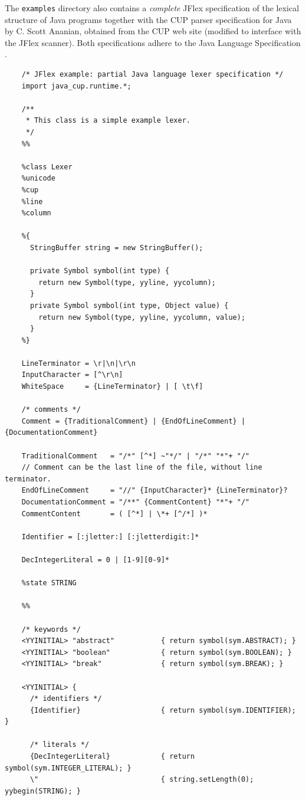 The \texttt{examples} directory also contains a \emph{complete} JFlex
specification of the lexical structure of Java programs together with
the CUP parser specification for Java by C. Scott Ananian, obtained from
the CUP \autocite{CUP} web site (modified to interface with the JFlex
scanner). Both specifications adhere to the Java Language Specification
\autocite{LangSpec}.

\begin{verbatim}
    /* JFlex example: partial Java language lexer specification */
    import java_cup.runtime.*;

    /**
     * This class is a simple example lexer.
     */
    %%

    %class Lexer
    %unicode
    %cup
    %line
    %column

    %{
      StringBuffer string = new StringBuffer();

      private Symbol symbol(int type) {
        return new Symbol(type, yyline, yycolumn);
      }
      private Symbol symbol(int type, Object value) {
        return new Symbol(type, yyline, yycolumn, value);
      }
    %}

    LineTerminator = \r|\n|\r\n
    InputCharacter = [^\r\n]
    WhiteSpace     = {LineTerminator} | [ \t\f]

    /* comments */
    Comment = {TraditionalComment} | {EndOfLineComment} | {DocumentationComment}

    TraditionalComment   = "/*" [^*] ~"*/" | "/*" "*"+ "/"
    // Comment can be the last line of the file, without line terminator.
    EndOfLineComment     = "//" {InputCharacter}* {LineTerminator}?
    DocumentationComment = "/**" {CommentContent} "*"+ "/"
    CommentContent       = ( [^*] | \*+ [^/*] )*

    Identifier = [:jletter:] [:jletterdigit:]*

    DecIntegerLiteral = 0 | [1-9][0-9]*

    %state STRING

    %%

    /* keywords */
    <YYINITIAL> "abstract"           { return symbol(sym.ABSTRACT); }
    <YYINITIAL> "boolean"            { return symbol(sym.BOOLEAN); }
    <YYINITIAL> "break"              { return symbol(sym.BREAK); }

    <YYINITIAL> {
      /* identifiers */ 
      {Identifier}                   { return symbol(sym.IDENTIFIER); }
     
      /* literals */
      {DecIntegerLiteral}            { return symbol(sym.INTEGER_LITERAL); }
      \"                             { string.setLength(0); yybegin(STRING); }


\end{verbatim}
